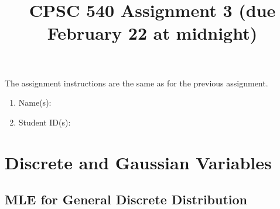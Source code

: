 \documentclass{article}
\def\blu#1{{\color{blu}#1}}
\def\enum#1{\begin{enumerate}#1\end{enumerate}}
\begin{document}
\title{CPSC 540 Assignment 3 (due February 22 at midnight)}
\author{}
\date{}
\maketitle
\vspace{-4em}

The assignment instructions are the same as for the previous assignment.


\blu{\enum{
\item Name(s):
\item Student ID(s):
}}


\section{Discrete and Gaussian Variables}



\subsection{MLE for General Discrete Distribution}
\end{document}
